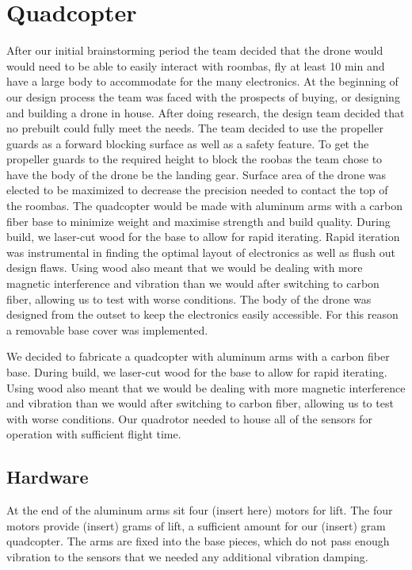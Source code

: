 \documentclass[12pt]{article}
\begin{document}
\section{Quadcopter}
After our initial brainstorming period the team decided that the drone would would need to be able to easily interact with roombas, fly at least 10 min and have a large body to accommodate for the many electronics. At the beginning of our design process the team was faced with the prospects of buying, or designing and building a drone in house. After doing research, the design team decided that no prebuilt could fully meet the needs. The team decided to use the propeller guards as a forward blocking surface as well as a safety feature. To get the propeller guards to the required height to block the roobas the team chose to have the body of the drone be the landing gear. Surface area of the drone was elected to be maximized to decrease the precision needed to contact the top of the roombas. The quadcopter would be made with aluminum arms with a carbon fiber base to minimize weight and maximise strength and build quality. During build, we laser-cut wood for the base to allow for rapid iterating. Rapid iteration was instrumental in finding the optimal layout of electronics as well as flush out design flaws. Using wood also meant that we would be dealing with more magnetic interference and vibration than we would after switching to carbon fiber, allowing us to test with worse conditions. The body of the drone was designed from the outset to keep the electronics easily accessible. For this reason a removable base cover was implemented. 

We decided to fabricate a quadcopter with aluminum arms with a carbon fiber base. During build, we laser-cut wood for the base to allow for rapid iterating. Using wood also meant that we would be dealing with more magnetic interference and vibration than we would after switching to carbon fiber, allowing us to test with worse conditions. Our quadrotor needed to house all of the sensors for operation with sufficient flight time. 

\subsection{Hardware} 
At the end of the aluminum arms sit four (insert here) motors for lift. The four motors provide (insert) grams of lift, a sufficient amount for our (insert) gram quadcopter. The arms are fixed into the base pieces, which do not pass enough vibration to the sensors that we needed any additional vibration damping. 
\end{document}
